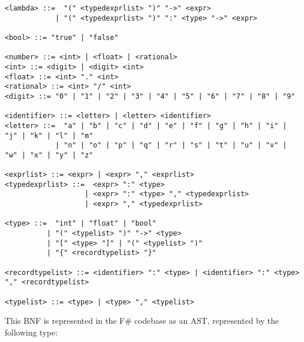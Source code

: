 \begin{verbatim}
<lambda> ::=  "(" <typedexprlist> ")" "->" <expr>
            | "(" <typedexprlist> ")" ":" <type> "->" <expr>

<bool> ::= "true" | "false"

<number> ::= <int> | <float> | <rational>
<int> ::= <digit> | <digit> <int>
<float> ::= <int> "." <int>
<rational> ::= <int> "/" <int>
<digit> ::= "0" | "1" | "2" | "3" | "4" | "5" | "6" | "7" | "8" | "9"

<identifier> ::= <letter> | <letter> <identifier>
<letter> ::=  "a" | "b" | "c" | "d" | "e" | "f" | "g" | "h" | "i" | "j" | "k" | "l" | "m" 
            | "n" | "o" | "p" | "q" | "r" | "s" | "t" | "u" | "v" | "w" | "x" | "y" | "z"

<exprlist> ::= <expr> | <expr> "," <exprlist>
<typedexprlist> ::=  <expr> ":" <type> 
                   | <expr> ":" <type> "," <typedexprlist>
                   | <expr> "," <typedexprlist>

<type> ::=  "int" | "float" | "bool" 
          | "(" <typelist> ")" "->" <type> 
          | "[" <type> "]" | "(" <typelist> ")"
          | "{" <recordtypelist> "}"

<recordtypelist> ::= <identifier> ":" <type> | <identifier> ":" <type> "," <recordtypelist>

<typelist> ::= <type> | <type> "," <typelist>
\end{verbatim}

This BNF is represented in the F\# codebase as an AST, represented by the following type:

